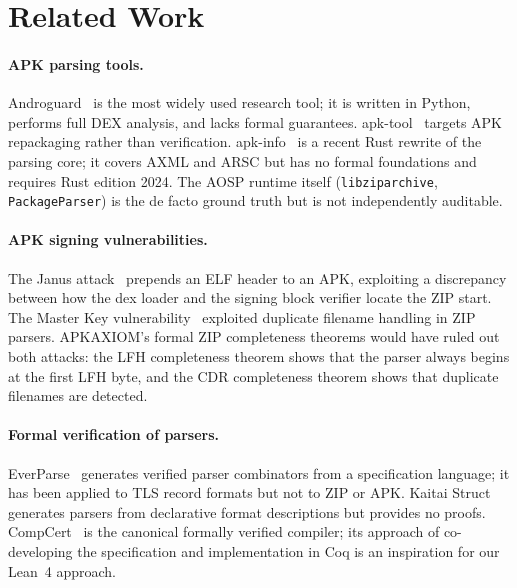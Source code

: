 \documentclass[runningheads]{llncs}
\begin{document}
\section{Related Work}
\label{sec:related}

\paragraph{APK parsing tools.}
Androguard~\cite{androguard} is the most widely used research tool; it is
written in Python, performs full DEX analysis, and lacks formal guarantees.
apk-tool~\cite{apktool} targets APK repackaging rather than verification.
apk-info~\cite{apkinfo} is a recent Rust rewrite of the parsing core; it covers
AXML and ARSC but has no formal foundations and requires Rust edition 2024.
The AOSP runtime itself (\texttt{libziparchive}, \texttt{PackageParser}) is the
de facto ground truth but is not independently auditable.

\paragraph{APK signing vulnerabilities.}
The Janus attack~\cite{janus2017} prepends an ELF header to an APK, exploiting
a discrepancy between how the dex loader and the signing block verifier locate
the ZIP start.  The Master Key vulnerability~\cite{masterkey2013} exploited
duplicate filename handling in ZIP parsers.  APKAXIOM's formal ZIP completeness
theorems would have ruled out both attacks: the LFH completeness theorem shows
that the parser always begins at the first LFH byte, and the CDR completeness
theorem shows that duplicate filenames are detected.

\paragraph{Formal verification of parsers.}
EverParse~\cite{everparse} generates verified parser combinators from a
specification language; it has been applied to TLS record formats but not to
ZIP or APK.  Kaitai Struct~\cite{kaitai} generates parsers from declarative
format descriptions but provides no proofs.  CompCert~\cite{compcert} is the
canonical formally verified compiler; its approach of co-developing the
specification and implementation in Coq is an inspiration for our Lean~4
approach.
\end{document}
